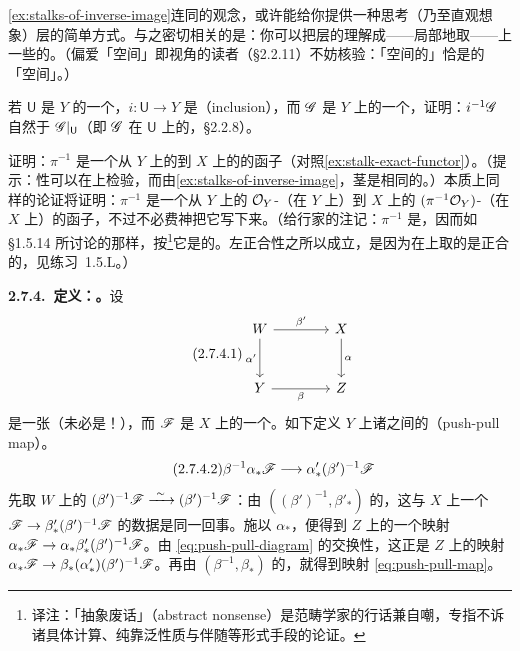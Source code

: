 \cref{ex:stalks-of-inverse-image}连同\trCompatibleGerm{}的观念，或许能给你提供一种思考（乃至直观想象）\trInverseImage{}层的简单方式。与之密切相关的是：你可以把\trInverseImage{}层的\trSection{}理解成——局部地取——\trTarget{}上一些\trSection{}的\trInverseImage。（偏爱「\trSection{}空间」即\trEspaceEtale{}视角的读者（\S2.2.11）不妨核验：「\trSection{}空间的\trInverseImage」恰是\trInverseImage{}的「\trSection{}空间」。）

\begin{exercise}[容易但有用]\label{ex:inverse-image-restriction}
若 $\mathsf{U}$ 是 $Y$ 的一个\trOpenSubset，$i\colon\mathsf{U}\to Y$ 是\trInclusionMap{}（inclusion），而 $\mathscr{G}$ 是 $Y$ 上的一个\trSheaf，证明：$i^{-1}\mathscr{G}$ 自然\trIsomorphic{}于 $\mathscr{G}|_\mathsf{U}$（即 $\mathscr{G}$ 在 $\mathsf{U}$ 上的\trRestriction，\S2.2.8）。
\end{exercise}

\begin{exercise}\label{ex:inverse-image-exact}
证明：$\pi^{-1}$ 是一个从 $Y$ 上\trAbelianGroups{}的\trSheaves{}到 $X$ 上\trAbelianGroups{}的\trSheaves{}的\trExact{}函子（对照\cref{ex:stalk-exact-functor}）。（提示：\trExact{}性可以在\trStalk{}上检验，而由\cref{ex:stalks-of-inverse-image}，茎是相同的。）本质上同样的论证将证明：$\pi^{-1}$ 是一个从 $Y$ 上的 $\mathcal{O}_Y$-\trModule（在 $Y$ 上）到 $X$ 上的 $(\pi^{-1}\mathcal{O}_Y)$-\trModule（在 $X$ 上）的\trExact{}函子，不过不必费神把它写下来。（给行家的注记：$\pi^{-1}$ 是\trLeftAdjoint，因而如 \S1.5.14 所讨论的那样，按\trAbstractNonsense\footnote{译注：「抽象废话」（abstract nonsense）是范畴学家的行话兼自嘲，专指不诉诸具体计算、纯靠泛性质与伴随等形式手段的论证。}它是\trRightExact{}的。左正合性之所以成立，是因为\trAbelianGroups{}在\trFiltered{}\trIndexSet{}上取的\trColimit{}是正合的，见\mbox{练习~1.5.L}。）
\end{exercise}

\textbf{2.7.4.\ 定义：\trPushPullMap{}。}\quad 设
\begin{equation*}\tag{2.7.4.1}\label{eq:push-pull-diagram}
\begin{tikzcd}[row sep=2.8em, column sep=4em]
W \ar[r, "\beta'"] \ar[d, "\alpha'"'] & X \ar[d, "\alpha"] \\
Y \ar[r, "\beta"'] & Z
\end{tikzcd}
\end{equation*}
是一张\trCommutativeDiagram{}（未必是\trCartesianDiagram{}！），而 $\mathscr{F}$ 是 $X$ 上的一个\trSheaf。如下定义 $Y$ 上诸\trSheaves{}之间的\textbf{\trPushPullMap{}}（push-pull map）。
\begin{equation*}\tag{2.7.4.2}\label{eq:push-pull-map}
\beta^{-1}\alpha_*\mathscr{F}\longrightarrow\alpha'_*(\beta')^{-1}\mathscr{F}
\end{equation*}
先取 $W$ 上的\trIdMorphism{} $(\beta')^{-1}\scr{F}\mathrel{\xrightarrow{\ \sim\ }}(\beta')^{-1}\scr{F}$：由 $((\beta')^{-1},\beta'_*)$ 的\trAdjointness{}，这与 $X$ 上一个\trMorphism{} $\mathscr{F}\to\beta'_*(\beta')^{-1}\mathscr{F}$ 的数据是同一回事。施以 $\alpha_*$，便得到 $Z$ 上的一个映射 $\alpha_*\mathscr{F}\to\alpha_*\beta'_*(\beta')^{-1}\mathscr{F}$。由 \eqref{eq:push-pull-diagram} 的交换性，这正是 $Z$ 上的映射 $\alpha_*\mathscr{F}\to\beta_*(\alpha'_*)(\beta')^{-1}\mathscr{F}$。再由 $(\beta^{-1},\beta_*)$ 的\trAdjointness{}，就得到映射 \eqref{eq:push-pull-map}。


